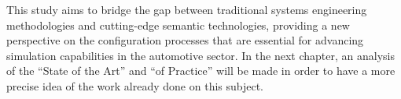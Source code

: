 This study aims to bridge the gap between traditional systems engineering methodologies and cutting-edge semantic technologies, providing a new perspective on the configuration processes that are essential for advancing simulation capabilities in the automotive sector. In the next chapter, an analysis of the “State of the Art” and “of Practice” will be made in order to have a more precise idea of the work already done on this subject.












